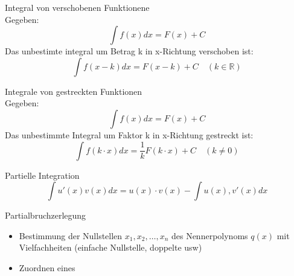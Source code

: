 \begin{lemma}{Integral von verschobenen Funktionene}\\
	Gegeben:
	\[\int{f(x)dx} = F(x) + C \]
	Das unbestimte integral um Betrag k in x-Richtung verschoben ist:
	\[\int{f(x-k)dx}= F(x-k)+C \quad (k \in \mathbb{R}) \]
\end{lemma}
\begin{lemma}{Integrale von gestreckten Funktionen}\\
    Gegeben:
    \[\int{f(x)dx} = F(x)+C \]
    Das unbestimmte Integral um Faktor k in x-Richtung gestreckt ist:
    \[\int{f(k\cdot x)dx}= \frac{1}{k}F(k\cdot x)+C \quad (k\neq0 )\]
\end{lemma}
\begin{theorem}{Partielle Integration}\\
    \[\int{u'(x)v(x)dx} = u(x)\cdot v(x) - \int{u(x),v'(x)dx} \]	
\end{theorem}
\begin{theorem}{Partialbruchzerlegung}\\
    \begin{itemize}
	\item Bestimmung der Nullstellen \(x_1,x_2, \ldots ,x_n \) des Nennerpolynoms \(q(x)\) mit Vielfachheiten (einfache Nullstelle, doppelte usw)
	\item Zuordnen eines 
    \end{itemize}
\end{theorem}

















